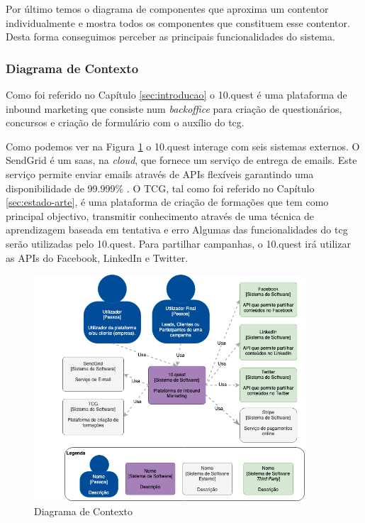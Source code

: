 Por último temos o diagrama de componentes que aproxima um contentor individualmente e mostra todos os componentes que constituem esse contentor. Desta forma conseguimos perceber as principais funcionalidades do sistema. 


\subsubsection{Diagrama de Contexto}

Como foi referido no Capítulo \ref{sec:introducao} o 10.quest é uma plataforma de inbound marketing que consiste num \textit{backoffice} para criação de questionários, concursos e criação de formulário com o auxílio do \acrshort{tcg}.

Como podemos ver na Figura \ref{fig:arq-contexto} o 10.quest interage com seis sistemas externos. O SendGrid\cite{sg} é um \acrshort{saas}, na \textit{cloud}, que fornece um serviço de entrega de emails. Este serviço permite enviar emails através de APIs flexíveis garantindo uma disponibilidade  de 99.999\% \cite{sguptime}. 
O TCG, tal como foi referido no Capítulo \ref{sec:estado-arte}, é uma plataforma de criação de formações que tem como principal objectivo, transmitir conhecimento através de uma técnica de aprendizagem baseada em tentativa e erro Algumas das funcionalidades do \acrshort{tcg} serão utilizadas pelo 10.quest.
Para partilhar campanhas, o 10.quest irá utilizar as APIs do Facebook, LinkedIn e Twitter.


\newpage

\begin{figure}[ht!]
	\begin{center}
		\includegraphics[width=0.9\textwidth]{img/arq/diagrama-contexto}
		\caption{Diagrama de Contexto}
		\label{fig:arq-contexto}
	\end{center}
\end{figure}

